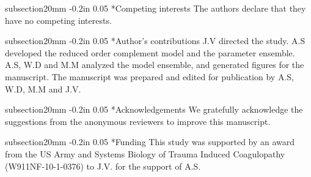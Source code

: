 \documentclass[12pt]{article}
\makeatletter
\renewcommand\section{\@startsection
	{subsection}{2}{0mm}
	{-0.2in}
	{0.05\baselineskip}
	{\normalfont\large\bfseries}}
\makeatother
\begin{document}

\clearpage

\section*{Competing interests}
The authors declare that they have no competing interests.

\section*{Author's contributions}
J.V directed the study. A.S developed the reduced order complement model and the parameter ensemble.
A.S, W.D and M.M analyzed the model ensemble, and generated figures for the manuscript.
The manuscript was prepared and edited for publication by A.S, W.D, M.M and J.V.

\section*{Acknowledgements}
We gratefully acknowledge the suggestions from the anonymous reviewers to improve this manuscript.

\section*{Funding}
This study was supported by an award from the US Army and Systems Biology of Trauma Induced Coagulopathy (W911NF-10-1-0376) to J.V. for the support of A.S.

\clearpage




\clearpage

\end{document}
